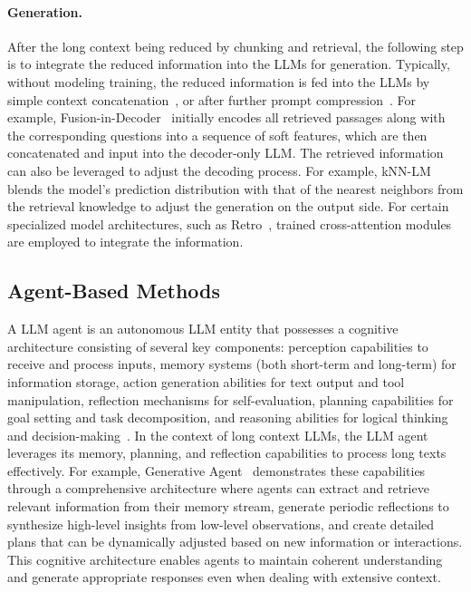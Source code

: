 \documentclass[11pt, a4paper, logo, copyright, nonumbering]{map}
\begin{document}
\paragraph{Generation.} After the long context being reduced by chunking and retrieval, the following step is to integrate the reduced information into the LLMs for generation. Typically, without modeling training, the reduced information is fed into the LLMs by simple context concatenation~\citep{replug, realm, atlas}, or after further prompt compression~\citep{recomp}. For example, Fusion-in-Decoder~\citep{fusion-in-decoder} initially encodes all retrieved passages along with the corresponding questions into a sequence of soft features, which are then concatenated and input into the decoder-only LLM. The retrieved information can also be leveraged to adjust the decoding process. For example, kNN-LM~\citep{knn-lm} blends the model's prediction distribution with that of the nearest neighbors from the retrieval knowledge to adjust the generation on the output side. For certain specialized model architectures, such as Retro~\citep{retro}, trained cross-attention modules are employed to integrate the information.


\subsection{Agent-Based Methods}
\label{sec:agent_based_methods}

A LLM agent is an autonomous LLM entity that possesses a cognitive architecture consisting of several key components: perception capabilities to receive and process inputs, memory systems (both short-term and long-term) for information storage, action generation abilities for text output and tool manipulation, reflection mechanisms for self-evaluation, planning capabilities for goal setting and task decomposition, and reasoning abilities for logical thinking and decision-making~\citep{agent-survey-1, agent-survey-2}. In the context of long context LLMs, the LLM agent leverages its memory, planning, and reflection capabilities to process long texts effectively. For example, Generative Agent~\citep{generative-agents} demonstrates these capabilities through a comprehensive architecture where agents can extract and retrieve relevant information from their memory stream, generate periodic reflections to synthesize high-level insights from low-level observations, and create detailed plans that can be dynamically adjusted based on new information or interactions. This cognitive architecture enables agents to maintain coherent understanding and generate appropriate responses even when dealing with extensive context.
\end{document}
